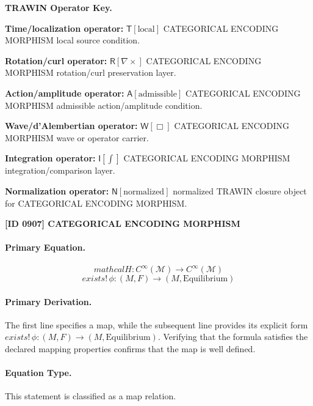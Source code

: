 \par\vspace{0.45\baselineskip}
\noindent\begin{minipage}[t]{\linewidth}
\begingroup
\small
\raggedright
\textbf{TRAWIN Operator Key.}\par
\noindent\textbf{Time/localization operator:} $\mathsf{T}\!\left[\mathrm{local}\right]$ CATEGORICAL ENCODING MORPHISM local source condition.\par
\noindent\textbf{Rotation/curl operator:} $\mathsf{R}\!\left[\nabla\times\right]$ CATEGORICAL ENCODING MORPHISM rotation/curl preservation layer.\par
\noindent\textbf{Action/amplitude operator:} $\mathsf{A}\!\left[\mathrm{admissible}\right]$ CATEGORICAL ENCODING MORPHISM admissible action/amplitude condition.\par
\noindent\textbf{Wave/d'Alembertian operator:} $\mathsf{W}\!\left[\Box\right]$ CATEGORICAL ENCODING MORPHISM wave or operator carrier.\par
\noindent\textbf{Integration operator:} $\mathsf{I}\!\left[\int\right]$ CATEGORICAL ENCODING MORPHISM integration/comparison layer.\par
\noindent\textbf{Normalization operator:} $\mathsf{N}\!\left[\mathrm{normalized}\right]$ normalized TRAWIN closure object for CATEGORICAL ENCODING MORPHISM.\par
\endgroup
\end{minipage}

\clearpage
\noindent\textbf{[ID 0907] CATEGORICAL ENCODING MORPHISM}\par
\vspace{0.35em}
\paragraph{Primary Equation.}
\[
mathcal{H}\colon C^{\infty}(\mathcal{M}) \to C^{\infty}(\mathcal{M})
\]
\[
exists!\,\phi\colon (M,F) \to (M,\mathrm{Equilibrium})
\]

\paragraph{Primary Derivation.}
The first line specifies a map, while the subsequent line provides its explicit form \( exists!\,\phi\colon (M,F) \to (M,\mathrm{Equilibrium}) \). Verifying that the formula satisfies the declared mapping properties confirms that the map is well defined.
\paragraph{Equation Type.}
This statement is classified as a map relation.

